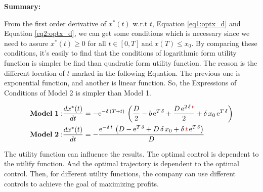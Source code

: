 \documentclass{article}
\begin{document}



{\bf Summary:}

From the first order derivative of $x^*(t)$ w.r.t $t$, Equation \eqref{eq1:optx_d} and Equation \eqref{eq2:optx_d}, we can get some conditions which is necessary since we need to assure $x^*(t)\geq 0$ for all $t\in[0,T]\ \text{and}\ x(T)\le x_0$. By comparing these conditions, it's easily to find that the conditions of logarithmic form utility function is simpler be find than quadratic form utility function. The reason is the different location of $t$ marked in the following Equation. The previous one is exponential function, and another is linear function. So, the Expressions of Conditions of Model 2 is simpler than Model 1.

\begin{gather*}
    \begin{split}
        {\bf Model\ 1:}&\frac{dx^*(t)}{dt}=-{\mathrm{e}}^{-\delta \,\left(T+t\right)}\,\left(\frac{D}{2}-b\,{\mathrm{e}}^{T\,\delta }+\frac{D\,{\mathrm{e}}^{2\,\delta \,\textcolor{red}{t}}}{2}+\delta \,x_{0}\,{\mathrm{e}}^{T\,\delta }\right)\\
        {\bf Model\ 2:}&\frac{dx^*(t)}{dt}=-\frac{{\mathrm{e}}^{-\delta \,t}\,\left(D-{\mathrm{e}}^{T\,\delta }+D\,\delta \,x_{0}+\delta \,\textcolor{red}{t}\,{\mathrm{e}}^{T\,\delta }\right)}{D}
    \end{split}
\end{gather*}

The utility function can influence the results. The optimal control is dependent to the utilify function. And the optimal trajectory is dependent to the optimal control. Then, for different utility functions, the company can use different controls to achieve the goal of maximizing profits.
\end{document}
